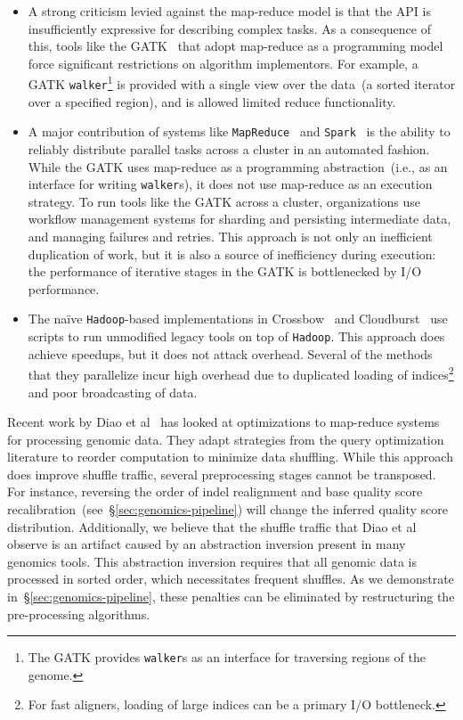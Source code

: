 \documentclass[masters]{ucbthesis}
\begin{document}
\begin{itemize}
\item A strong criticism levied against the map-reduce model is that the API is insufficiently expressive
for describing complex tasks. As a consequence of this, tools like the GATK~\cite{mckenna10} that
adopt map-reduce as a programming model force significant restrictions on algorithm implementors. For
example, a GATK \texttt{walker}\footnote{The GATK provides \texttt{walker}s as an interface for
traversing regions of the genome.} is provided with a single view over the data~(a sorted iterator over a
specified region), and is allowed limited reduce functionality.
\item A major contribution of systems like \texttt{MapReduce}~\cite{dean08} and \texttt{Spark}~\cite{zaharia10,
zaharia12} is the ability to reliably distribute parallel tasks across a cluster in an automated fashion. While
the GATK uses map-reduce as a programming abstraction~(i.e., as an interface for writing
\texttt{walker}s), it does not use map-reduce as an execution strategy. To run tools like the GATK across
a cluster, organizations use workflow management systems for sharding and persisting intermediate
data, and managing failures and retries. This approach is not only an inefficient duplication of work, but it
is also a source of inefficiency during execution: the performance of iterative stages in the GATK is
bottlenecked by I/O performance.
\item The na\"{i}ve \texttt{Hadoop}-based implementations in Crossbow~\cite{langmead09} and
Cloudburst~\cite{schatz09} use scripts to run unmodified legacy tools on top of \texttt{Hadoop}. This approach
does achieve speedups, but it does not attack overhead. Several of the methods that they parallelize
incur high overhead due to duplicated loading of indices\footnote{For fast aligners, loading of large indices can be
a primary I/O bottleneck.} and poor broadcasting of data.
\end{itemize}

Recent work by Diao et al~\cite{diao15} has looked at optimizations to map-reduce systems for
processing genomic data. They adapt strategies from the query optimization literature to reorder
computation to minimize data shuffling. While this approach does improve shuffle traffic, several
preprocessing stages cannot be transposed. For instance, reversing the order of indel realignment and
base quality score recalibration~(see~\S\ref{sec:genomics-pipeline}) will change the inferred quality
score distribution. Additionally, we believe that the shuffle traffic that Diao et al observe is an artifact
caused by an abstraction inversion present in many genomics tools. This abstraction inversion requires
that all genomic data is processed in sorted order, which necessitates frequent shuffles. As we
demonstrate in~\S\ref{sec:genomics-pipeline}, these penalties can be eliminated by restructuring the
pre-processing algorithms.
\end{document}
